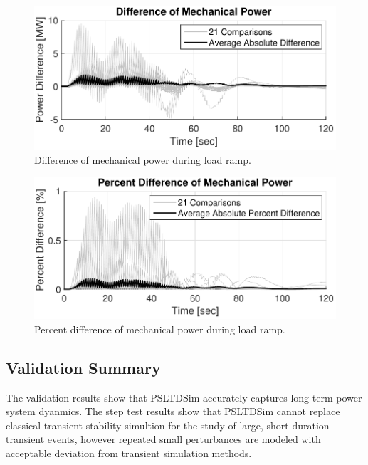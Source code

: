 \begin{figure}[!ht]
	\centering
	\includegraphics[width=\linewidth]{figures/miniWECC3ALTDrampPm2}
	\caption{Difference of mechanical power during load ramp.}
	\label{fig: rampPmdif}
\end{figure}

\begin{figure}[!ht]
	\centering
	\includegraphics[width=\linewidth]{figures/miniWECC3ALTDrampPm3}
	\caption{Percent difference of mechanical power during load ramp.}
	\label{fig: rampPmPercentdif}
\end{figure}
\subsection{Validation Summary}
The validation results show that PSLTDSim accurately captures long term power system dyanmics. The step test results show that PSLTDSim cannot replace classical transient stability simultion for the study of large, short-duration transient events, however repeated small perturbances are modeled with acceptable deviation from transient simulation methods.